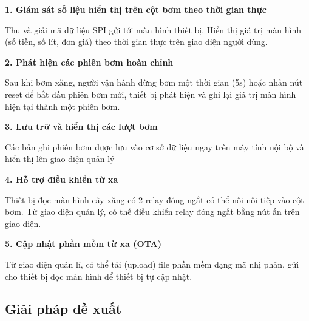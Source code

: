  \textbf{1. \quad Giám sát số liệu hiển thị trên cột bơm theo thời gian thực}

 Thu và giải mã dữ liệu SPI gửi tới màn hình thiết bị. Hiển thị giá trị màn hình (số tiền, số lít, đơn giá) theo thời gian thực trên giao diện người dùng.

  \textbf{
    2. \quad  Phát hiện các phiên bơm hoàn chỉnh
 }

 Sau khi bơm xăng, người vận hành dừng bơm một thời gian (5s) hoặc nhấn nút reset để bắt đầu phiên bơm mới, thiết bị phát hiện và ghi lại giá trị màn hình hiện tại thành một phiên bơm.

  \textbf{
    3. \quad Lưu trữ và hiển thị các lượt bơm
 }

 Các bản ghi phiên bơm được lưu vào cơ sở dữ liệu ngay trên máy tính nội bộ và hiển thị lên giao diện quản lý

 \textbf{
    4. \quad Hỗ trợ điều khiển từ xa
 }

Thiết bị đọc màn hình cây xăng có 2 relay đóng ngắt có thể nối nối tiếp vào cột bơm. Từ giao diện quản lý, có thể điều khiển relay đóng ngắt bằng nút ấn trên giao diện.


 \textbf{
    5. \quad Cập nhật phần mềm từ xa (OTA)
 }

 Từ giao diện quản lí, có thể tải (upload) file phần mềm dạng mã nhị phân, gửi cho thiết bị đọc màn hình để thiết bị tự cập nhật. 

\subsection{Giải pháp đề xuất}


